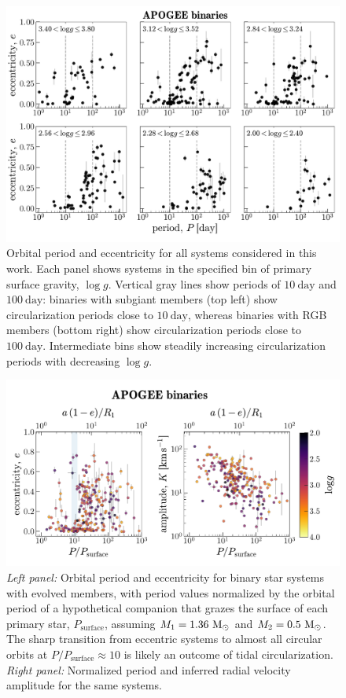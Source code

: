 \documentclass[modern, letterpaper]{aastex62}
\newcommand{\logg}{\ensuremath{\log g}}
\begin{document}
\begin{figure}[t]
\begin{center}
\includegraphics[width=\textwidth]{P-e-grid}
\end{center}
\caption{%
Orbital period and eccentricity for all systems considered in this work.
Each panel shows systems in the specified bin of primary surface gravity, \logg.
Vertical gray lines show periods of $10~\textrm{day}$ and $100~\textrm{day}$:
binaries with subgiant members (top left) show circularization periods close to
$10~\textrm{day}$, whereas binaries with RGB members (bottom right) show
circularization periods close to $100~\textrm{day}$.
Intermediate bins show steadily increasing circularization periods with
decreasing \logg.
\label{fig:P-e-grid}
}
\end{figure}

\begin{figure}[t]
\begin{center}
\includegraphics[width=\textwidth]{P-e-K}
\end{center}
\caption{%
\textit{Left panel:} Orbital period and eccentricity for binary star systems
with evolved members, with period values normalized by the orbital period
of a hypothetical companion that grazes the surface of each primary star,
$P_{\textrm{surface}}$, assuming $M_1 = 1.36~\mathrm{M}_\odot$ and $M_2 = 0.5~\mathrm{M}_\odot$.
The sharp transition from eccentric systems to almost all circular orbits at
$P/P_\textrm{surface} \approx 10$ is likely an outcome of tidal circularization.
\textit{Right panel:} Normalized period and inferred radial velocity amplitude
for the same systems.
\label{fig:PeK}
}
\end{figure}
\end{document}
